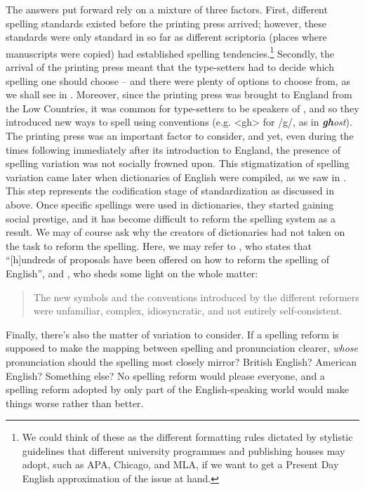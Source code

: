 The answers put forward rely on a mixture of three factors. First, different spelling standards existed before the printing press arrived; however, these standards were only standard in so far as different scriptoria (places where man\-u\-scripts were copied) had established spelling tendencies.\footnote{We could think of these as the different formatting rules dictated by stylistic guidelines that different university programmes and publishing houses may adopt, such as APA, Chicago, and MLA, if we want to get a Present Day English approximation of the issue at hand.} Secondly, the arrival of the printing press meant that the type-setters had to decide which spelling one should choose -- and there were plenty of options to choose from, as we shall see in . Moreover, since the printing press was brought to England from the Low Countries, it was common for type-setters to be speakers of , and so they introduced new ways to spell using  conventions (e.g. <gh> for /g/, as in \textit{\textbf{gh}ost}). The printing press was an important factor to consider, and yet, even during the times following immediately after its introduction to England, the presence of spelling variation was not socially frowned upon. This stigmatization of spelling variation came later when dictionaries of English were compiled, as we saw in . This step represents the codification stage of standardization as discussed in  above. Once specific spellings were used in dictionaries, they started gaining social prestige, and it has become difficult to reform the spelling system as a result. We may of course ask why the creators of dictionaries had not taken on the task to reform the spelling. Here, we may refer to \citet[113]{Marshall2011}, who states that ``[h]undreds of proposals have been offered on how to reform the spelling of English'', and \citet[268]{Crystal2005}, who sheds some light on the whole matter:

\begin{quote}
    The new symbols and the conventions introduced by the different reformers were unfamiliar, complex, idiosyncratic, and not entirely self-consistent.
\end{quote}

\noindent Finally, there's also the matter of variation to consider. If a spelling reform is supposed to make the mapping between spelling and pronunciation clearer, \textit{whose} pronunciation should the spelling most closely mirror? British English? American English? Something else? No spelling reform would please everyone, and a spelling reform adopted by only part of the English-speaking world would make things worse rather than better.


